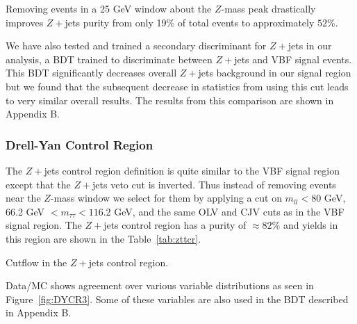 Removing events in a 25 GeV window about the $Z$-mass peak drastically improves $Z+$jets purity from only 19$\%$ of total events to approximately $52\%$. 

We have also tested and trained a secondary discriminant for $Z+$jets in our analysis, a BDT trained to discriminate between $Z+$jets and VBF signal events. This BDT significantly decreases overall $Z+$jets background in our signal region but we found that the subsequent decrease in statistics from using this cut leads to very similar overall results. The results from this comparison are shown in Appendix B. 

\subsubsection{Drell-Yan Control Region}

The $Z+$jets control region definition is quite similar to the VBF signal region except that the $Z+$jets veto cut is inverted. Thus instead of removing events near the $Z$-mass window we select for them by applying a cut on $m_{ll}<80$ GeV,  66.2 GeV $< m_{\tau\tau}< 116.2$ GeV, and the same OLV and CJV cuts as in the VBF signal region. The $Z+$jets control region has a purity of $\approx 82\%$ and yields in this region are shown in the Table~\ref{tab:zttcr}.

\begin{table}[h!]
\centering
\resizebox{\textwidth}{!}{
}
\caption{Cutflow in the $Z+$jets control region.}
\label{tab:zttcr}
\end{table}

Data/MC shows agreement over various variable distributions as seen in Figure~\ref{fig:DYCR3}. Some of these variables are also used in the BDT described in Appendix B. 

